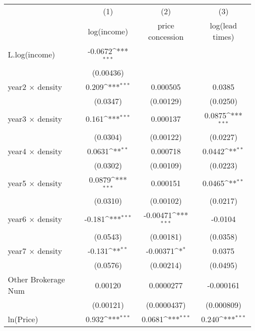 {
\def\sym#1{\ifmmode^{#1}\else\(^{#1}\)\fi}
\begin{tabular}{l*{3}{c}}
\toprule
            &\multicolumn{1}{c}{(1)}&\multicolumn{1}{c}{(2)}&\multicolumn{1}{c}{(3)}\\
            &\multicolumn{1}{c}{log(income)}&\multicolumn{1}{c}{price concession}&\multicolumn{1}{c}{log(lead times)}\\
\midrule
L.log(income) &     -0.0672\sym{***}&                     &                     \\
            &   (0.00436)         &                     &                     \\
\addlinespace
year2 $\times$ density&       0.209\sym{***}&    0.000505         &      0.0385         \\
            &    (0.0347)         &   (0.00129)         &    (0.0250)         \\
\addlinespace
year3 $\times$ density&       0.161\sym{***}&    0.000137         &      0.0875\sym{***}\\
            &    (0.0304)         &   (0.00122)         &    (0.0227)         \\
\addlinespace
year4 $\times$ density&      0.0631\sym{**} &    0.000718         &      0.0442\sym{**} \\
            &    (0.0302)         &   (0.00109)         &    (0.0223)         \\
\addlinespace
year5 $\times$ density&      0.0879\sym{***}&    0.000151         &      0.0465\sym{**} \\
            &    (0.0310)         &   (0.00102)         &    (0.0217)         \\
\addlinespace
year6 $\times$ density&      -0.181\sym{***}&    -0.00471\sym{***}&     -0.0104         \\
            &    (0.0543)         &   (0.00181)         &    (0.0358)         \\
\addlinespace
year7 $\times$ density&      -0.131\sym{**} &    -0.00371\sym{*}  &      0.0375         \\
            &    (0.0576)         &   (0.00214)         &    (0.0495)         \\
\addlinespace
Other Brokerage Num  &     0.00120         &   0.0000277         &   -0.000161         \\
            &   (0.00121)         & (0.0000437)         &  (0.000809)         \\
\addlinespace
ln(Price)&       0.932\sym{***}&      0.0681\sym{***}&       0.240\sym{***}\\

\end{tabular}}
